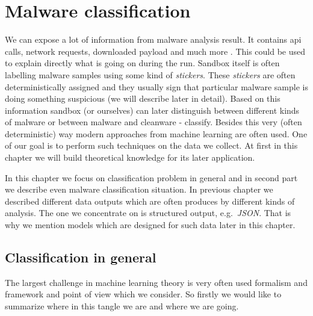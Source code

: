 \chapter{Malware classification}
We can expose a lot of information from malware analysis result. It contains api calls, network requests, downloaded payload and much more . This could be used to explain directly what is going on during the run. Sandbox itself is often labelling malware samples using some kind of \emph{stickers}. These \emph{stickers} are often deterministically assigned and they usually sign that particular malware sample is doing something suspicious (we will describe later in detail). Based on this information sandbox (or ourselves) can later distinguish between different kinds of malware or between malware and cleanware - classify. Besides this very (often deterministic) way modern approaches from machine learning are often used. One of our goal is to perform such techniques on the data we collect. At first in this chapter we will build theoretical knowledge for its later application.

In this chapter we focus on classification problem in general and in second part we describe even malware classification situation. In previous chapter we described different data outputs which are often produces by different kinds of analysis. The one we concentrate on is structured output, e.g.\ \emph{JSON}. That is why we mention models which are designed for such data later in this chapter.

\section{Classification in general}

The largest challenge in machine learning theory is very often used formalism and framework and point of view which we consider. So firstly we would like to summarize where in this tangle we are and where we are going.

 \citeauthor{Russell2009}

